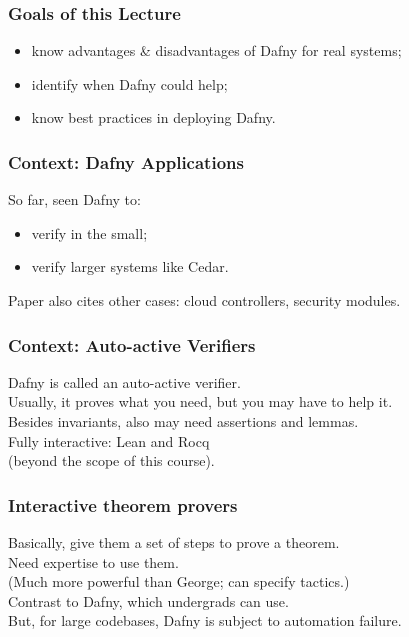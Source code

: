 \documentclass{beamer}
\newenvironment{changemargin}[1]{%
  \begin{list}{}{%
    \setlength{\topsep}{0pt}%
    \setlength{\leftmargin}{#1}%
    \setlength{\rightmargin}{1em}
    \setlength{\listparindent}{\parindent}%
    \setlength{\itemindent}{\parindent}%
    \setlength{\parsep}{\parskip}%
  }%
  \item[]}{\end{list}}
\begin{document}
\begin{frame}
  \frametitle{Goals of this Lecture}
    \Large
  \begin{changemargin}{1cm}
    \begin{itemize}
    \item know advantages \& disadvantages of Dafny for real systems;
    \item identify when Dafny could help;
    \item know best practices in deploying Dafny.
    \end{itemize}
  \end{changemargin}
\end{frame}

\begin{frame}
  \frametitle{Context: Dafny Applications}
    \Large
    \begin{changemargin}{1cm}
      So far, seen Dafny to:
    \begin{itemize}
    \item verify in the small;
    \item verify larger systems like Cedar.
    \end{itemize}
    Paper also cites other cases: cloud controllers, security modules.
  \end{changemargin}
\end{frame}
    
\begin{frame}
  \frametitle{Context: Auto-active Verifiers}
    \Large
    \begin{changemargin}{1cm}
      Dafny is called an auto-active verifier.\\[1em]
      Usually, it proves what you need, but you may have to help it.\\
      Besides invariants, also may need assertions and lemmas.\\[1em]
      Fully interactive: Lean and Rocq \\
      \qquad (beyond the scope of this course).
      
    \end{changemargin}
\end{frame}

\begin{frame}
  \frametitle{Interactive theorem provers}
    \Large
    \begin{changemargin}{1cm}
      Basically, give them a set of steps to prove a theorem.\\[1em]
      Need expertise to use them.\\
      (Much more powerful than George; can specify tactics.)\\[1em]
      Contrast to Dafny, which undergrads can use.\\
      But, for large codebases, Dafny is subject to automation failure.
    \end{changemargin}
\end{frame}
\end{document}
